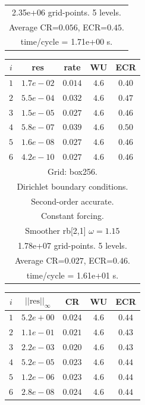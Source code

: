 \begin{table}[hbt]
\begin{center}
\begin{tabular}{|c|c|c|c|c|}
\multicolumn{5}{|c|}{2.35e+06 grid-points. 5 levels.}  \\
\multicolumn{5}{|c|}{Average CR=$0.056$, ECR=$0.45$.}  \\
\multicolumn{5}{|c|}{time/cycle = 1.71e+00 s.}  \\
\hline 
\end{tabular}
\begin{tabular}{|c|c|c|c|c|} \hline 
 $i$   & res      & rate    &  WU    & ECR  \\   \hline 
 $ 1$  & $ 1.7e-02$ & $0.014$ & $ 4.6$ & $0.40$ \\ 
 $ 2$  & $ 5.5e-04$ & $0.032$ & $ 4.6$ & $0.47$ \\ 
 $ 3$  & $ 1.5e-05$ & $0.027$ & $ 4.6$ & $0.46$ \\ 
 $ 4$  & $ 5.8e-07$ & $0.039$ & $ 4.6$ & $0.50$ \\ 
 $ 5$  & $ 1.6e-08$ & $0.027$ & $ 4.6$ & $0.46$ \\ 
 $ 6$  & $ 4.2e-10$ & $0.027$ & $ 4.6$ & $0.46$ \\ 
\hline 
\multicolumn{5}{|c|}{Grid: box256.}  \\
\multicolumn{5}{|c|}{Dirichlet boundary conditions.}  \\
\multicolumn{5}{|c|}{Second-order accurate.}  \\
\multicolumn{5}{|c|}{Constant forcing.}  \\
\multicolumn{5}{|c|}{Smoother rb[2,1] $\omega=1.15$}  \\
\multicolumn{5}{|c|}{1.78e+07 grid-points. 5 levels.}  \\
\multicolumn{5}{|c|}{Average CR=$0.027$, ECR=$0.46$.}  \\
\multicolumn{5}{|c|}{time/cycle = 1.61e+01 s.}  \\
\hline 
\end{tabular}
\begin{tabular}{|c|c|c|c|c|} \hline 
 $i$   & $\vert\vert\mbox{res}\vert\vert_\infty$  &  CR     &  WU    & ECR  \\   \hline 
 $ 1$  & $ 5.2e+00$ & $0.024$ & $ 4.6$ & $0.44$ \\ 
 $ 2$  & $ 1.1e-01$ & $0.021$ & $ 4.6$ & $0.43$ \\ 
 $ 3$  & $ 2.2e-03$ & $0.020$ & $ 4.6$ & $0.43$ \\ 
 $ 4$  & $ 5.2e-05$ & $0.023$ & $ 4.6$ & $0.44$ \\ 
 $ 5$  & $ 1.2e-06$ & $0.023$ & $ 4.6$ & $0.44$ \\ 
 $ 6$  & $ 2.8e-08$ & $0.024$ & $ 4.6$ & $0.44$ \\ 

\end{tabular}
\end{center}
\end{table}
